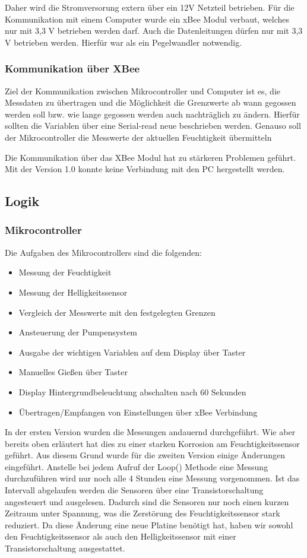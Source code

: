\documentclass[]{IEEEtran}
\begin{document}
	Daher wird die Stromversorung extern über ein 12V Netzteil betrieben. Für die Kommunikation mit einem Computer wurde ein xBee Modul verbaut, welches nur mit 3,3 V betrieben werden darf. Auch die Datenleitungen dürfen nur mit 3,3 V betrieben werden. Hierfür war als ein Pegelwandler notwendig.
	
	\subsubsection{Kommunikation über XBee}
	Ziel der Kommunikation zwischen Mikrocontroller und Computer ist es, die Messdaten zu übertragen und die Möglichkeit die Grenzwerte ab wann gegossen werden soll bzw. wie lange gegossen werden auch nachträglich zu ändern. Hierfür sollten die Variablen über eine Serial-read neue beschrieben werden. Genauso soll der Mikrocontroller die Messwerte der aktuellen  Feuchtigkeit übermitteln
	
	Die Kommunikation über das XBee Modul hat zu stärkeren Problemen geführt. Mit der Version 1.0 konnte keine Verbindung mit den PC hergestellt werden.
	
	\subsection{Logik}
	
		\subsubsection{Mikrocontroller}
		
		Die Aufgaben des Mikrocontrollers sind die folgenden:
			\begin{itemize}
				\item Messung der Feuchtigkeit
				\item Messung der Helligkeitssensor
				\item Vergleich der Messwerte mit den festgelegten Grenzen
				\item Ansteuerung der Pumpensystem
				\item Ausgabe der wichtigen Variablen auf dem Display über Taster
				\item Manuelles Gießen über Taster
				\item Display Hintergrundbeleuchtung abschalten nach 60  Sekunden
				\item Übertragen/Empfangen von Einstellungen über xBee Verbindung
			\end{itemize}
		
		In der ersten Version wurden die Messungen andauernd durchgeführt. Wie aber bereits oben erläutert hat dies zu einer starken Korrosion am Feuchtigkeitssensor geführt. Aus diesem Grund wurde für die zweiten Version einige Änderungen eingeführt. Anstelle bei jedem Aufruf der Loop() Methode eine Messung durchzuführen wird nur noch alle 4 Stunden eine Messung vorgenommen. Ist das Intervall abgelaufen werden die Sensoren über eine Transistorschaltung angesteuert und ausgelesen. Dadurch sind die Sensoren nur noch einen kurzen Zeitraum unter Spannung, was die Zerstörung des Feuchtigkeitssensor stark reduziert. Da diese Änderung eine neue Platine benötigt hat, haben wir sowohl den Feuchtigkeitssensor als auch den Helligkeitssensor mit einer Transistorschaltung ausgestattet. 
		
\end{document}
